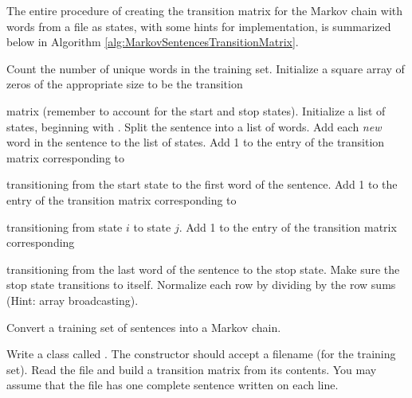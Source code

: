 The entire procedure of creating the transition matrix for the Markov chain with words from a file as states, with some hints for implementation, is summarized below in Algorithm \ref{alg:MarkovSentencesTransitionMatrix}.

\begin{algorithm} %
\begin{algorithmic}[1]
\State Count the number of unique words in the training set.
\State Initialize a square array of zeros of the appropriate size to be the transition \par\quad matrix (remember to account for the start and stop states).
\State Initialize a list of states, beginning with .
    \State Split the sentence into a list of words.
    \State Add each \emph{new} word in the sentence to the list of states.
    \State Add 1 to the entry of the transition matrix corresponding to
    \par\qquad\enspace transitioning from the start state to the first word of the sentence.
        \State Add 1 to the entry of the transition matrix corresponding to \par\qquad\qquad transitioning from state $i$ to state $j$.
    \EndFor
    \State Add 1 to the entry of the transition matrix corresponding
    \par\qquad\enspace transitioning from the last word of the sentence to the stop state.
\EndFor
\State Make sure the stop state transitions to itself.
\State Normalize each row by dividing by the row sums (Hint: array broadcasting).
\EndProcedure
\end{algorithmic}
\caption{Convert a training set of sentences into a Markov chain.}
\label{alg:MarkovSentencesTransitionMatrix}
\end{algorithm}

\begin{problem} %
Write a class called .
The constructor should accept a filename (for the training set).
Read the file and build a transition matrix from its contents.
You may assume that the file has one complete sentence written on each line.
\label{problem:MarkovClassPt1}
\end{problem}


